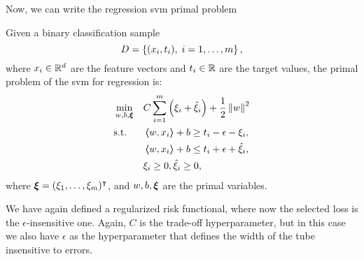 %
Now, we can write the regression \acrshort{svm} primal problem
\begin{definition}
    Given a binary classification sample
    $$ D = \left\{(x_i, t_i), \; i=1, \ldots, m\right\} ,$$
    where $x_i \in \mathbb{R}^d$ are the feature vectors and $t_i \in \mathbb{R}$ are the target values, 
    the primal problem of the \acrshort{svm} for regression is:
    \begin{equation}
        \label{eq:linear_primal_reg}
        \begin{aligned}
            &\min_{w, b, \fv{\xi}} & & C \sum_{i=1}^m \left(\xi_i + \hat{\xi}_i\right) + \frac{1}{2} \norm{w}^2 \\
            & \text{s.t.} & & \dotp{w}{x_i} + b \geq t_i - \epsilon - \xi_i  , \\
            & & & \dotp{w}{x_i} + b \leq t_i + \epsilon + \hat{\xi}_i , \\
            & & & \xi_i \geq 0 , \hat{\xi}_i \geq 0 ,      
        \end{aligned}  
    \end{equation}
    where $\bm{\xi} = (\xi_1, \ldots, \xi_m)^\intercal$, and $w, b, \bm{\xi}$ are the primal variables.
\end{definition}
We have again defined a regularized risk functional, where now the selected loss is the $\epsilon$-insensitive one. Again, $C$ is the trade-off hyperparameter, but in this case we also have $\epsilon$ as the hyperparameter that defines the width of the tube insensitive to errors.

